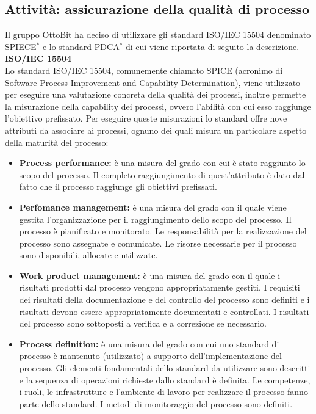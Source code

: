 \documentclass[11pt,a4paper]{article}
\begin{document}
{\subsection{Attività: assicurazione della qualità di processo}
Il gruppo OttoBit ha deciso di utilizzare gli standard ISO/IEC 15504 denominato SPIECE$^*$ e lo standard PDCA$^*$ di cui viene riportata di seguito la descrizione.\\
\textbf{ISO/IEC 15504} \\
Lo standard ISO/IEC 15504, comunemente chiamato SPICE (acronimo di Software Process Improvement and Capability Determination), viene utilizzato per eseguire una valutazione concreta della qualità dei processi, inoltre permette la misurazione della capability dei processi, ovvero l'abilità con cui esso raggiunge l'obiettivo prefissato. Per eseguire queste misurazioni lo standard offre nove attributi da associare ai processi, ognuno dei quali misura un particolare aspetto della maturità del processo:
\begin{itemize}
	\item \textbf{Process performance:} è una misura del grado con cui è stato raggiunto lo scopo del processo. Il completo raggiungimento di quest'attributo è dato dal fatto che il processo raggiunge gli obiettivi prefissati.
	\item \textbf{Perfomance management:} è una misura del grado con il quale viene gestita l'organizzazione per il raggiungimento dello scopo del processo. Il processo è pianificato e monitorato. Le responsabilità per la realizzazione del processo sono assegnate e comunicate. Le risorse necessarie per il processo sono disponibili, allocate e utilizzate. 
	\item \textbf{Work product management:} è una misura del grado con il quale i risultati prodotti dal processo vengono appropriatamente gestiti. I requisiti dei risultati della documentazione e del controllo del processo sono definiti e i risultati devono essere appropriatamente documentati e controllati. I risultati del processo sono sottoposti a verifica e a correzione se necessario.
	\item \textbf{Process definition:} è una misura del grado con cui uno standard di processo è mantenuto (utilizzato) a supporto dell'implementazione del processo. Gli elementi fondamentali dello standard da utilizzare sono descritti e la sequenza di operazioni richieste dallo standard è definita. Le competenze, i ruoli, le infrastrutture e l'ambiente di lavoro per realizzare il processo fanno parte dello standard. I metodi di monitoraggio del processo sono definiti.

\end{itemize}}
\end{document}
